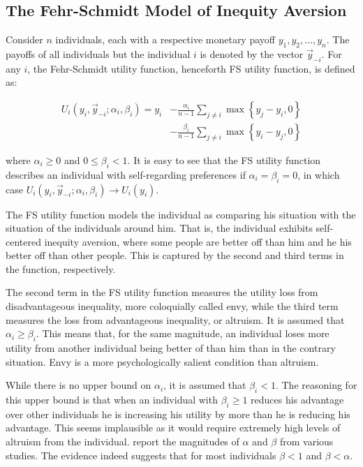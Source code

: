 \documentclass[12pt]{article}
\begin{document}
\subsection{The Fehr-Schmidt Model of Inequity Aversion}

Consider $n$ individuals, each with a respective monetary payoff $y_1,y_2,...,y_n$. The payoffs of all individuals but the individual $i$ is denoted by the vector $\vec{y}_{-i}$. For any $i$, the Fehr-Schmidt utility function, henceforth FS utility function, is defined as:

\begin{equation}
\begin{split}
	U_i\left(y_i,\vec{y}_{-i};\alpha_i,\beta_i\right) = y_i &- \frac{\alpha_i}{n-1} \sum_{j\neq i} \max \left \{ y_j - y_i,0 \right \}\\
	& - \frac{\beta_i}{n-1} \sum_{j\neq i} \max \left \{ y_i - y_j,0 \right \}
\end{split}
\end{equation}


\noindent
where $\alpha_i \geq 0$ and $0 \leq \beta_i <1$. It is easy to see that the FS utility function describes an individual with self-regarding preferences if $\alpha_i = \beta_i = 0$, in which case $U_i\left(y_i,\vec{y}_{-i};\alpha_i,\beta_i\right) \rightarrow U_i\left(y_i\right)$.

The FS utility function models the individual as comparing his situation with the situation of the individuals around him. That is, the individual exhibits self-centered inequity aversion, where some people are better off than him and he his better off than other people. This is captured by the second and third terms in the function, respectively.

The second term in the FS utility function measures the utility loss from disadvantageous inequality, more coloquially called envy, while the third term measures the loss from advantageous inequality, or altruism. It is assumed that $\alpha_i \geq \beta_i$. This means that, for the same magnitude, an individual loses more utility from another individual being better of than him than in the contrary situation. Envy is a more psychologically salient condition than altruism.

While there is no upper bound on $\alpha_i$, it is assumed that $\beta_i <1$. The reasoning for this upper bound is that when an individual with $\beta_i \geq 1$ reduces his advantage over other individuals he is increasing his utility by more than he is reducing his advantage. This seems implausible as it would require extremely high levels of altruism from the individual. \cite{Eckel2010} report the magnitudes of $\alpha$ and $\beta$ from various studies. The evidence indeed suggests that for most individuals $\beta <1$ and $\beta <\alpha$.
\end{document}
